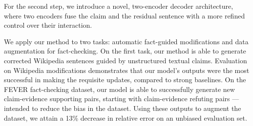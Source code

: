 \documentclass[letterpaper]{article} %
\begin{document}
For the second step, we introduce a novel, two-encoder decoder architecture, where two encoders fuse the claim and the residual sentence with a more refined control over their interaction.


We apply our method to two tasks: automatic fact-guided modifications and data augmentation for fact-checking. On the first task, our method is able to generate corrected Wikipedia sentences guided by unstructured textual claims. Evaluation on Wikipedia modifications demonstrates that our model's outputs were the most successful in making the requisite updates, compared to strong baselines. On the FEVER fact-checking dataset, our model is able to successfully generate new claim-evidence supporting pairs, starting with claim-evidence refuting pairs --- intended to reduce the bias in the dataset. Using these outputs to augment the dataset, we attain a 13\% decrease in relative error on an unbiased evaluation set.
%


\end{document}
